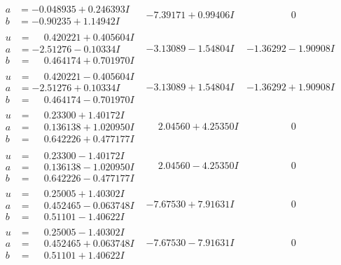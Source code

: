 \documentclass[1p]{elsarticle_modified}
\theoremstyle{definition}
\begin{document}
$$\begin{array}{c|c|c}
\begin{aligned}
a &= -0.048935 + 0.246393 I \\
b &= -0.90235 + 1.14942 I\end{aligned}
 & -7.39171 + 0.99406 I & \phantom{-0.000000 } 0 \\ \hline\begin{aligned}
u &= \phantom{-}0.420221 + 0.405604 I \\
a &= -2.51276 - 0.10334 I \\
b &= \phantom{-}0.464174 + 0.701970 I\end{aligned}
 & -3.13089 - 1.54804 I & -1.36292 - 1.90908 I \\ \hline\begin{aligned}
u &= \phantom{-}0.420221 - 0.405604 I \\
a &= -2.51276 + 0.10334 I \\
b &= \phantom{-}0.464174 - 0.701970 I\end{aligned}
 & -3.13089 + 1.54804 I & -1.36292 + 1.90908 I \\ \hline\begin{aligned}
u &= \phantom{-}0.23300 + 1.40172 I \\
a &= \phantom{-}0.136138 + 1.020950 I \\
b &= \phantom{-}0.642226 + 0.477177 I\end{aligned}
 & \phantom{-}2.04560 + 4.25350 I & \phantom{-0.000000 } 0 \\ \hline\begin{aligned}
u &= \phantom{-}0.23300 - 1.40172 I \\
a &= \phantom{-}0.136138 - 1.020950 I \\
b &= \phantom{-}0.642226 - 0.477177 I\end{aligned}
 & \phantom{-}2.04560 - 4.25350 I & \phantom{-0.000000 } 0 \\ \hline\begin{aligned}
u &= \phantom{-}0.25005 + 1.40302 I \\
a &= \phantom{-}0.452465 - 0.063748 I \\
b &= \phantom{-}0.51101 - 1.40622 I\end{aligned}
 & -7.67530 + 7.91631 I & \phantom{-0.000000 } 0 \\ \hline\begin{aligned}
u &= \phantom{-}0.25005 - 1.40302 I \\
a &= \phantom{-}0.452465 + 0.063748 I \\
b &= \phantom{-}0.51101 + 1.40622 I\end{aligned}
 & -7.67530 - 7.91631 I & \phantom{-0.000000 } 0\\

\end{array}$$
\end{document}

